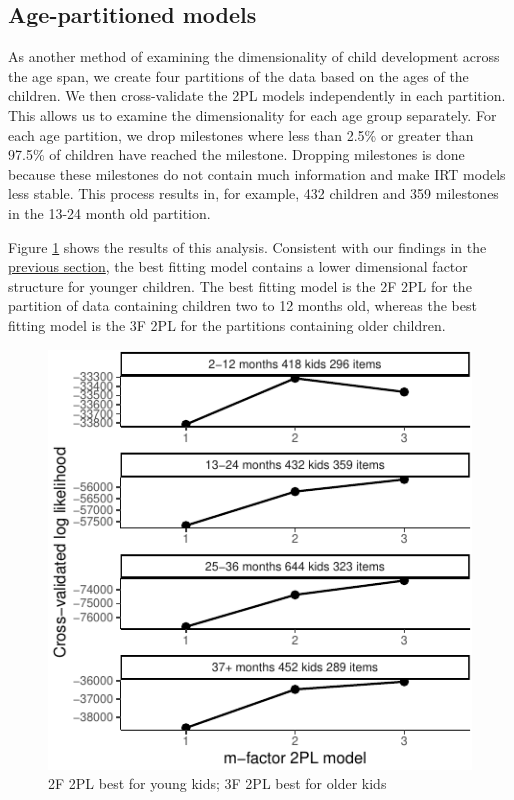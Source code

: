 \documentclass[10pt, letterpaper]{article}
\newenvironment{CodeChunk}{}{}
\begin{document}
\hypertarget{age-partitioned-models}{%
\subsection{Age-partitioned models}\label{age-partitioned-models}}

As another method of examining the dimensionality of child development
across the age span, we create four partitions of the data based on the
ages of the children. We then cross-validate the 2PL models
independently in each partition. This allows us to examine the
dimensionality for each age group separately. For each age partition, we
drop milestones where less than 2.5\% or greater than 97.5\% of children
have reached the milestone. Dropping milestones is done because these
milestones do not contain much information and make IRT models less
stable. This process results in, for example, 432 children and 359
milestones in the 13-24 month old partition.

Figure \ref{fig:partage} shows the results of this analysis. Consistent
with our findings in the \protect\hyperlink{full}{previous section}, the
best fitting model contains a lower dimensional factor structure for
younger children. The best fitting model is the 2F 2PL for the partition
of data containing children two to 12 months old, whereas the best
fitting model is the 3F 2PL for the partitions containing older
children.

\begin{CodeChunk}
\begin{figure}[tb]
\includegraphics{figs/partage-1} \caption[2F 2PL best for young kids]{2F 2PL best for young kids; 3F 2PL best for older kids}\label{fig:partage}
\end{figure}
\end{CodeChunk}
\end{document}

